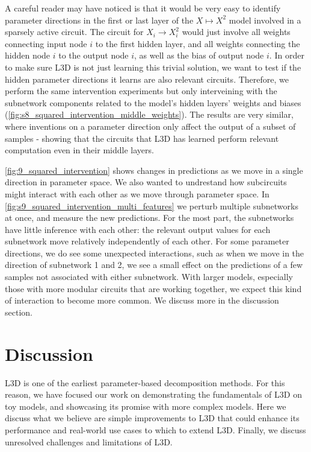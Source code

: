 \documentclass{article}
\theoremstyle{plain}
\theoremstyle{definition}
\theoremstyle{remark}
\begin{document}
A careful reader may have noticed is that it would be very easy to identify parameter directions in the first or last layer of the $X \mapsto X^2$ model involved in a sparsely active circuit. The circuit for $X_i \rightarrow X_i^2$ would just involve all weights connecting input node $i$ to the first hidden layer, and all weights connecting the hidden node $i$ to the output node $i$, as well as the bias of output node $i$. In order to make sure L3D is not just learning this trivial solution, we want to test if the hidden parameter directions it learns are also relevant circuits. Therefore, we perform the same intervention experiments but only interveining with the subnetwork components related to the model's hidden layers' weights and biases (\ref{fig:s8_squared_intervention_middle_weights}). The results are very similar, where inventions on a parameter direction only affect the output of a subset of samples - showing that the circuits that L3D has learned perform relevant computation even in their middle layers. 



\ref{fig:9_squared_intervention} shows changes in predictions as we move in a single direction in parameter space. We also wanted to undrestand how subcircuits might interact with each other as we move through parameter space. In \ref{fig:s9_squared_intervention_multi_features} we perturb multiple subnetworks at once, and measure the new predictions. For the most part, the subnetworks have little inference with each other: the relevant output values for each subnetwork move relatively independently of each other. For some parameter directions, we do see some unexpected interactions, such as when we move in the direction of subnetwork 1 and 2, we see a small effect on the predictions of a few samples not associated with either subnetwork. With larger models, especially those with more modular circuits that are working together, we expect this kind of interaction to become more common. We discuss more in the discussion section. 

\section{Discussion}

L3D is one of the earliest parameter-based decomposition methods. For this reason, we have focused our work on demonstrating the fundamentals of L3D on toy models, and showcasing its promise with more complex models. Here we discuss what we believe are simple improvements to L3D that could enhance its performance and real-world use cases to which to extend L3D. Finally, we discuss unresolved challenges and limitations of L3D. 
\end{document}
